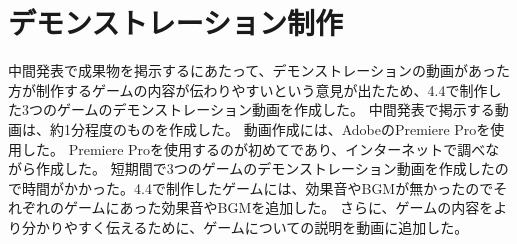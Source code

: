 \section{デモンストレーション制作}
中間発表で成果物を掲示するにあたって、デモンストレーションの動画があった方が制作するゲームの内容が伝わりやすいという意見が出たため、4.4で制作した3つのゲームのデモンストレーション動画を作成した。
中間発表で掲示する動画は、約1分程度のものを作成した。
動画作成には、AdobeのPremiere Proを使用した。
Premiere Proを使用するのが初めてであり、インターネットで調べながら作成した。
短期間で3つのゲームのデモンストレーション動画を作成したので時間がかかった。4.4で制作したゲームには、効果音やBGMが無かったのでそれぞれのゲームにあった効果音やBGMを追加した。
さらに、ゲームの内容をより分かりやすく伝えるために、ゲームについての説明を動画に追加した。
